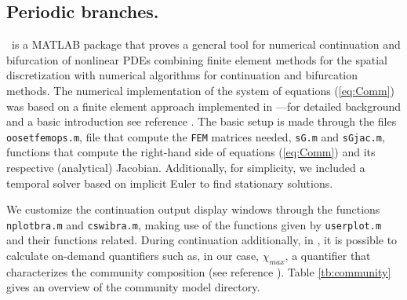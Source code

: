 \documentclass[a4paper,12pt]{article}
\begin{document}
\subsection{Periodic branches.}\label{subsec:PB}
\pdep\, is a MATLAB package that proves a general tool for numerical continuation and bifurcation of nonlinear PDEs combining finite element methods for the spatial discretization with numerical algorithms for continuation and bifurcation methods. The numerical implementation of the system of equations (\ref{eq:Comm}) was based on a finite element approach implemented in \pdep---for detailed background \cite{uecker2021numerical} and a basic introduction see reference \cite{rademacher2018oopde,uecker2019pattern}. The basic setup is made through the files {\tt oosetfemops.m}, file that compute the {\tt FEM} matrices needed, {\tt sG.m} and {\tt sGjac.m}, functions that compute the right-hand side of equations (\ref{eq:Comm}) and its respective (analytical) Jacobian. Additionally, for simplicity, we included a temporal solver based on implicit Euler to find stationary solutions. 

We customize the continuation output display windows through the functions {\tt nplotbra.m} and {\tt cswibra.m}, making use of the functions given by {\tt userplot.m} and their functions related. During continuation additionally, in \pdep, it is possible to calculate on-demand quantifiers such as, in our case, $\chi_{max}$, a quantifier that characterizes the community composition (see reference \cite{FPBUM24}). Table \ref{tb:community} gives an overview of the community model directory.
\end{document}
